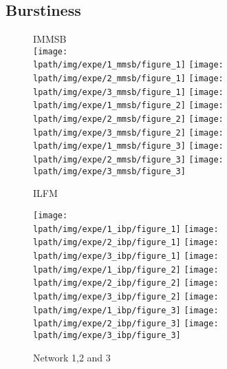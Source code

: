 \documentclass[a4paper, 12pt]{article}
\begin{document}
\subsection{Burstiness}
\clearpage

\begin{figure}[ht]
    \vspace{-3cm}
	\centering IMMSB\\
	\texttt{[image: \\lpath/img/expe/1\_mmsb/figure\_1]}
	\endminipage
	\texttt{[image: \\lpath/img/expe/2\_mmsb/figure\_1]}
	\endminipage
	\texttt{[image: \\lpath/img/expe/3\_mmsb/figure\_1]}
	\endminipage
		\vspace{-0.29cm}
	\texttt{[image: \\lpath/img/expe/1\_mmsb/figure\_2]}
	\endminipage
	\texttt{[image: \\lpath/img/expe/2\_mmsb/figure\_2]} 
	\endminipage
	\texttt{[image: \\lpath/img/expe/3\_mmsb/figure\_2]}
	\endminipage
		\vspace{-0.28cm}
	\texttt{[image: \\lpath/img/expe/1\_mmsb/figure\_3]}
	\endminipage
	\texttt{[image: \\lpath/img/expe/2\_mmsb/figure\_3]} 
	\endminipage
	\texttt{[image: \\lpath/img/expe/3\_mmsb/figure\_3]}
	\endminipage

    \vspace{0.2cm}
	 ILFM

	\texttt{[image: \\lpath/img/expe/1\_ibp/figure\_1]}
	\endminipage
	\texttt{[image: \\lpath/img/expe/2\_ibp/figure\_1]}
	\endminipage
	\texttt{[image: \\lpath/img/expe/3\_ibp/figure\_1]}
	\endminipage
		\vspace{-0.29cm}
	\texttt{[image: \\lpath/img/expe/1\_ibp/figure\_2]}
	\endminipage
	\texttt{[image: \\lpath/img/expe/2\_ibp/figure\_2]} 
	\endminipage
	\texttt{[image: \\lpath/img/expe/3\_ibp/figure\_2]}
	\endminipage
		\vspace{-0.28cm}
	\texttt{[image: \\lpath/img/expe/1\_ibp/figure\_3]}
	\endminipage
	\texttt{[image: \\lpath/img/expe/2\_ibp/figure\_3]} 
	\endminipage
	\texttt{[image: \\lpath/img/expe/3\_ibp/figure\_3]}
	\endminipage
    \caption{Network 1,2 and 3}

\end{figure}
\end{document}

